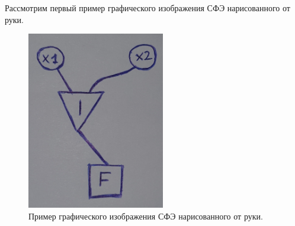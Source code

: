 \documentclass[makeidx, a4paper, 14pt]{extarticle}
\begin{document}
Рассмотрим первый пример графического изображения СФЭ нарисованного от руки.

\begin{figure}[H]
    \centering
    \includegraphics[width=60mm]{handwritten_2.png}
    \caption{Пример графического изображения СФЭ нарисованного от руки.}
    \label{fig:handwritten_2}
\end{figure}
\end{document}
